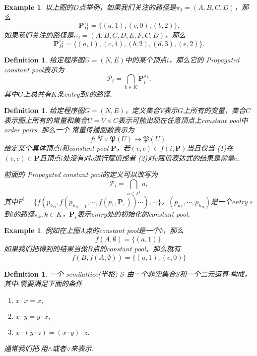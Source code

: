\documentclass{article}
\newtheorem{example}[theorem]{Example}
\newtheorem{definition}[theorem]{Definition}
\newcommand*{\xfunc}[4]{{#2}\colon{#3}{#1}{#4}}
\newcommand*{\func}[3]{\xfunc{\to}{#1}{#2}{#3}}
\begin{document}

\begin{example} 
\rm 以上图的$D$点举例，如果我们关注的路径是$\pi_1 = (A,B,C,D)$，那么
$$
\mathbf{P}_D^{\pi_1} = \{(a,1),(c,0),(b,2)\}.
$$
如果我们关注的路径是$\pi_2 = (A,B,C,D,E,F,C,D)$，那么
$$
\mathbf{P}_D^{\pi_2} = \{(a,1),(c,4),(b,2),(d,3),(e,2)\}.
$$
\end{example}


\begin{definition}
\rm 给定程序图$G = (N,E)$中的某个顶点$i$，那么它的{\color{red} Propagated constant pool}表示为
$$
\mathcal{P}_{i} = \bigcap\limits_{k \in K} \mathbf{P}_i^{\pi_k}.
$$
其中$G$上总共有$K$条entry到$i$的路径.
\end{definition}

\begin{definition}
\rm 给定程序图$G=(N,E)$，定义集合$V$表示$G$上所有的变量，集合$C$表示图上所有的常量和集合$U = V \times C$表示可能出现在任意顶点上constant pool中order pairs. 那么一个{\color{red} 常量传播函数}表示为
$$
\func{f}{\overline{N} \times \mathfrak{P}(U)}{\mathfrak{P}(U)}. 
$$
给定某个具体顶点$i$和constant pool $\mathbf{P}$，若$(v,c) \in f(i,\mathbf{P})$当且仅当{\color{red} (1)}在$(v,c) \in \mathbf{P}$且顶点$i$处没有对$v$进行赋值或者{\color{red} (2)}对$v$赋值表达式的结果是常量$c$.

前面的{\color{red} Propagated constant pool}的定义可以改写为
$$
\mathcal{P}_i  = \bigcap\limits_{u \in F^{i}} u,
$$
其中$F^{i} = \{f({p_k}_n,f({p_k}_{n-1},\cdots,f(p_1,\mathbf{P}_{\varepsilon}))\cdots),\cdots\}$，$({p_k}_1,\cdots,{p_k}_n)$是一个entry $\varepsilon$到$i$的路径$\pi_k, k \in K$，$\mathbf{P}_{\varepsilon}$表示entry处的初始化的constant pool.
\end{definition}

\begin{example}
\rm 例如在上图$A$点的constant pool是一个$\emptyset$，那么
$$
f(A,\emptyset) = \{(a,1)\}.$$
如果我们把得到的结果当做$B$点的constant pool，那么就有
$$
f(B,f(A,\emptyset)) = \{(a,1),(c,0)\}
$$
\end{example}

\begin{definition}
\rm 一个{\color{red} semilattice(半格)} $\mathcal{S}$ 由一个非空集合$S$和一个二元运算$\cdot$构成，其中$\cdot$需要满足下面的条件
\begin{enumerate}
	\item $x \cdot x = x,$
	\item $x \cdot y =  y \cdot x,$
	\item $x \cdot (y \cdot z) = (x \cdot y) \cdot z.$
\end{enumerate}
通常我们把$\cdot$用$\wedge$或者$\vee$来表示.
\end{definition}
\end{document}
